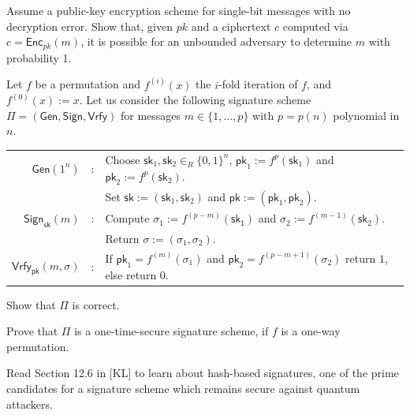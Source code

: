 \documentclass[a4paper,10pt,landscape,twocolumn]{scrartcl}
\begin{document}
\begin{bonusexercise}
	Assume a public-key encryption scheme for single-bit messages with no
	decryption error. Show that, given $pk$ and a ciphertext $c$ computed via
	$c=\mathsf{Enc}_{pk}(m)$, it is possible for an unbounded adversary to determine
	$m$ with probability 1.
\end{bonusexercise}


\begin{bonusexercise}
Let $f$ be a permutation and $f^{(i)}(x)$ the $i$-fold iteration of $f$,
and $f^{(0)}(x) := x$. Let us consider the following signature scheme
$\Pi = (\mathsf{Gen},\mathsf{Sign},\mathsf{Vrfy})$ for messages $m \in \{1, \ldots, p\}$ with $p = p(n)$ polynomial in $n$.
\begin{center}\vspace{-1em}
\begin{tabular}{rcl}
  $\mathsf{Gen}(1^n)$ & : &
    Choose $\mathsf{sk}_1,\mathsf{sk}_2 \in_R \{0,1\}^n$, $\mathsf{pk}_1 := f^p(\mathsf{sk}_1)$ and $\mathsf{pk}_2 := f^p(\mathsf{sk}_2)$. \\
    & & Set $\mathsf{sk} := (\mathsf{sk}_1,\mathsf{sk}_2)$ and $\mathsf{pk} := (\mathsf{pk}_1,\mathsf{pk}_2)$.\\[5pt]
  $\mathsf{Sign}_{\mathsf{sk}}(m)$ & : &
    Compute $\sigma_1 := f^{(p-m)}(\mathsf{sk_1})$ and $\sigma_2 := f^{(m-1)}(\mathsf{sk}_2)$.\\
    && Return $\sigma := (\sigma_1,\sigma_2)$.\\[5pt]
  $\mathsf{Vrfy}_{\mathsf{pk}}(m,\sigma)$ & : &
    If $\mathsf{pk}_1 =
  f^{(m)}(\sigma_1)$ and $\mathsf{pk}_2 = f^{(p-m+1)}(\sigma_2)$ return $1$,
  else return $0$.
\end{tabular}
\end{center}
\begin{subex}
Show that $\Pi$ is correct.
\end{subex}
\begin{subex}
Prove that $\Pi$ is a one-time-secure signature scheme, if
  $f$ is a one-way permutation.
\end{subex}
\end{bonusexercise}

\begin{bonusexercise}
Read Section 12.6 in [KL] to learn about hash-based signatures, one of the prime candidates for a signature scheme which remains secure against quantum attackers.
\end{bonusexercise}
\end{document}
